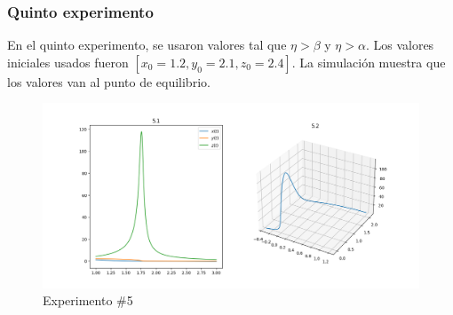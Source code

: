 \documentclass[12pt, a4paper]{article}
\begin{document}
\subsubsection*{Quinto experimento}

En el quinto experimento, se usaron valores tal que $\eta > \beta$ y $\eta > \alpha$.
Los valores iniciales usados fueron $[x_0=1.2, y_0=2.1, z_0=2.4]$. La simulación muestra 
que los valores van al punto de equilibrio.

\begin{figure}[!h]
    \includegraphics[width=\linewidth]{../images/5.png}
    \caption{Experimento \#5}
\end{figure}
\end{document}
